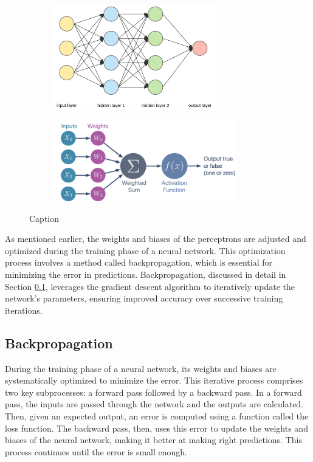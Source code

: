 \begin{figure}[H]
    \centering
    \begin{subfigure}{0.45\textwidth}
        \includegraphics[width=7cm]{Cap2_LitReview/model_basics/Neural_networks/neural_network.png}
        \caption{\cite{P._2025}}
        \label{fig:neural_network-a}
    \end{subfigure}
    \hspace{0.2cm}
    \begin{subfigure}{0.45\textwidth}
        \includegraphics[width=8cm]{Cap2_LitReview/model_basics/Neural_networks/perceptron.png}
        \caption{\cite{Weaver_2024}}
        \label{fig:neural_network-b}
    \end{subfigure}
    \caption{Caption}
    \label{fig:neural_network}
\end{figure}

As mentioned earlier, the weights and biases of the perceptrons are adjusted and optimized during the training phase of a neural network. This optimization process involves a method called backpropagation, which is essential for minimizing the error in predictions. Backpropagation, discussed in detail in Section \ref{sec-backpropagation}, leverages the gradient descent algorithm to iteratively update the network's parameters, ensuring improved accuracy over successive training iterations.

\subsection{Backpropagation} \label{sec-backpropagation}

During the training phase of a neural network, its weights and biases are systematically optimized to minimize the error. This iterative process comprises two key subprocesses: a forward pass followed by a backward pass. In a forward pass, the inputs are passed through the network and the outputs are calculated. Then, given an expected output, an error is computed using a function called the loss function. The backward pass, then, uses this error to update the weights and biases of the neural network, making it better at making right predictions. This process continues until the error is small enough.

